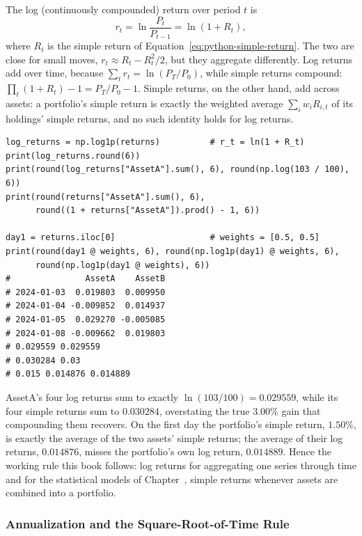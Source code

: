 \documentclass[../ai_in_finance]{subfiles}
\begin{document}
The log (continuously compounded) return over period $t$ is
\begin{equation}
r_t = \ln\frac{P_t}{P_{t-1}} = \ln(1 + R_t),\label{eq:python-log-return}
\end{equation}
where $R_t$ is the simple return of Equation~\eqref{eq:python-simple-return}. The two are close for small moves, $r_t \approx R_t - R_t^2/2$, but they aggregate differently. Log returns add over time, because $\sum_t r_t = \ln(P_T/P_0)$, while simple returns compound: $\prod_t(1+R_t) - 1 = P_T/P_0 - 1$. Simple returns, on the other hand, add across assets: a portfolio's simple return is exactly the weighted average $\sum_i w_i R_{i,t}$ of its holdings' simple returns, and no such identity holds for log returns.

\begin{verbatim}
log_returns = np.log1p(returns)          # r_t = ln(1 + R_t)
print(log_returns.round(6))
print(round(log_returns["AssetA"].sum(), 6), round(np.log(103 / 100), 6))
print(round(returns["AssetA"].sum(), 6),
      round((1 + returns["AssetA"]).prod() - 1, 6))

day1 = returns.iloc[0]                   # weights = [0.5, 0.5]
print(round(day1 @ weights, 6), round(np.log1p(day1) @ weights, 6),
      round(np.log1p(day1 @ weights), 6))
#               AssetA    AssetB
# 2024-01-03  0.019803  0.009950
# 2024-01-04 -0.009852  0.014937
# 2024-01-05  0.029270 -0.005085
# 2024-01-08 -0.009662  0.019803
# 0.029559 0.029559
# 0.030284 0.03
# 0.015 0.014876 0.014889
\end{verbatim}

AssetA's four log returns sum to exactly $\ln(103/100) = 0.029559$, while its four simple returns sum to $0.030284$, overstating the true 3.00\% gain that compounding them recovers. On the first day the portfolio's simple return, $1.50\%$, is exactly the average of the two assets' simple returns; the average of their log returns, $0.014876$, misses the portfolio's own log return, $0.014889$. Hence the working rule this book follows: log returns for aggregating one series through time and for the statistical models of Chapter~, simple returns whenever assets are combined into a portfolio.

\subsubsection*{Annualization and the Square-Root-of-Time Rule}
\end{document}
